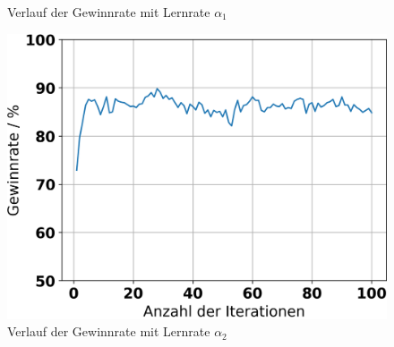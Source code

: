 \begin{figure}[H]
\begin{minipage}[c]{0.32\linewidth}
		\caption{Verlauf der Gewinnrate mit Lernrate $\alpha_1$}
	\end{minipage}
	\hfill
	\begin{minipage}[c]{0.32\linewidth}
		\includegraphics[width=\linewidth]{Bilder/ensemble-training/c_0_0001/graph_win_rates.png}
		\caption{Verlauf der Gewinnrate mit Lernrate $\alpha_2$}
	\end{minipage}
\end{figure}

